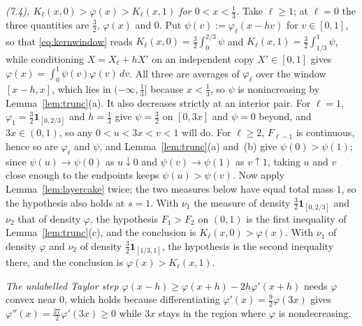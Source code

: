 \documentclass[11pt]{article}
\theoremstyle{definition}
\theoremstyle{remark}
\begin{document}
\emph{(7.4), $K_\ell(x,0)>\varphi(x)>K_\ell(x,1)$ for $0<x<\tfrac13$.}
Take $\ell\ge1$; at $\ell=0$ the three quantities are $\tfrac32$,
$\varphi(x)$ and $0$. Put $\psi(v):=\varphi_\ell(x-hv)$ for
$v\in[0,1]$, so that \eqref{eq:kernwindow} reads
$K_\ell(x,0)=\tfrac32\int_0^{2/3}\psi$ and
$K_\ell(x,1)=\tfrac32\int_{1/3}^{1}\psi$, while conditioning
$X=X_\ell+hX'$ on an independent copy $X'\in[0,1]$ gives
$\varphi(x)=\int_0^1\psi(v)\varphi(v)\,dv$. All three are averages of
$\varphi_\ell$ over the window $[x-h,x]$, which lies in
$(-\infty,\tfrac13]$ because $x<\tfrac13$, so $\psi$ is nonincreasing by
Lemma~\ref{lem:trunc}(a). It also decreases strictly at an interior
pair. For $\ell=1$, $\varphi_1=\tfrac32\mathbf1_{[0,2/3]}$ and $h=\tfrac13$
give $\psi=\tfrac32$ on $[0,3x]$ and $\psi=0$ beyond, and $3x\in(0,1)$,
so any $0<u<3x<v<1$ will do. For $\ell\ge2$, $F_{\ell-1}$ is continuous,
hence so are $\varphi_\ell$ and $\psi$, and
Lemma~\ref{lem:trunc}(a) and~(b) give $\psi(0)>\psi(1)$; since
$\psi(u)\to\psi(0)$ as $u\downarrow0$ and $\psi(v)\to\psi(1)$ as
$v\uparrow1$, taking $u$ and $v$ close enough to the endpoints keeps
$\psi(u)>\psi(v)$. Now apply
Lemma~\ref{lem:layercake} twice; the two measures below have equal
total mass $1$, so the hypothesis also holds at $s=1$. With $\nu_1$ the measure of density
$\tfrac32\mathbf1_{[0,2/3]}$ and $\nu_2$ that of density $\varphi$, the
hypothesis $F_1>F_2$ on $(0,1)$ is the first inequality of
Lemma~\ref{lem:trunc}(c), and the conclusion is
$K_\ell(x,0)>\varphi(x)$. With $\nu_1$ of density $\varphi$ and $\nu_2$
of density $\tfrac32\mathbf1_{[1/3,1]}$, the hypothesis is the second
inequality there, and the conclusion is $\varphi(x)>K_\ell(x,1)$.

\emph{The unlabelled Taylor step
$\varphi(x-h)\ge\varphi(x+h)-2h\varphi'(x+h)$} needs $\varphi$ convex
near $0$, which holds because differentiating
$\varphi'(x)=\tfrac92\varphi(3x)$ gives
$\varphi''(x)=\tfrac{27}{2}\varphi'(3x)\ge0$ while $3x$ stays in the
region where $\varphi$ is nondecreasing.
\end{document}
